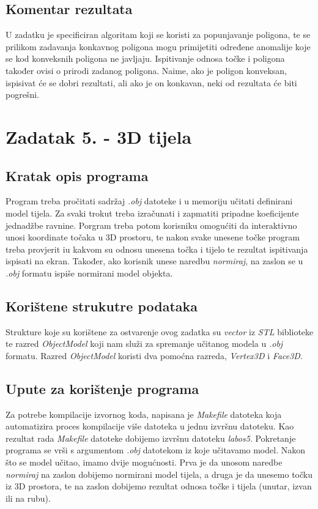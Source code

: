 \documentclass{report}
\begin{document}
\subsection{Komentar rezultata}
U zadatku je specificiran algoritam koji se koristi za popunjavanje poligona, te se prilikom zadavanja konkavnog poligona mogu primijetiti određene anomalije koje se kod konveksnih poligona ne javljaju. Ispitivanje odnosa točke i poligona također ovisi o prirodi zadanog poligona. Naime, ako je poligon konveksan, ispisivat će se dobri rezultati, ali ako je on konkavan, neki od rezultata će biti pogrešni.

\section{Zadatak 5. - 3D tijela}
\subsection{Kratak opis programa}
Program treba pročitati sadržaj \textit{.obj} datoteke i u memoriju učitati definirani model tijela. Za svaki trokut treba izračunati i zapmatiti pripadne koeficijente jednadžbe ravnine. Porgram treba potom korisniku omogućiti da interaktivno unosi koordinate točaka u 3D prostoru, te nakon svake unesene točke program treba provjerit iu kakvom su odnosu unesena točka i tijelo te rezultat ispitivanja ispisati na ekran. Također, ako korisnik unese naredbu \textit{normiraj}, na zaslon se u \textit{.obj} formatu ispiše normirani model objekta. 

\subsection{Korištene strukutre podataka}
Strukture koje su korištene za ostvarenje ovog zadatka su \textit{vector} iz \textit{STL} biblioteke te razred \textit{ObjectModel} koji nam služi za spremanje učitanog modela u \textit{.obj} formatu. Razred \textit{ObjectModel} koristi dva pomoćna razreda, \textit{Vertex3D} i \textit{Face3D}.

\subsection{Upute za korištenje programa}
Za potrebe kompilacije izvornog koda, napisana je \textit{Makefile} datoteka koja automatizira proces kompilacije više datoteka u jednu izvršnu datoteku. Kao rezultat rada \textit{Makefile} datoteke dobijemo izvršnu datoteku \textit{labos5}. Pokretanje programa se vrši s argumentom \textit{.obj} datotekom iz koje učitavamo model. Nakon što se model učitao, imamo dvije mogućnosti. Prva je da unosom naredbe \textit{normiraj} na zaslon dobijemo normirani model tijela, a druga je da unesemo točku iz 3D prostora, te na zaslon dobijemo rezultat odnosa točke i tijela (unutar, izvan ili na rubu).
\end{document}
